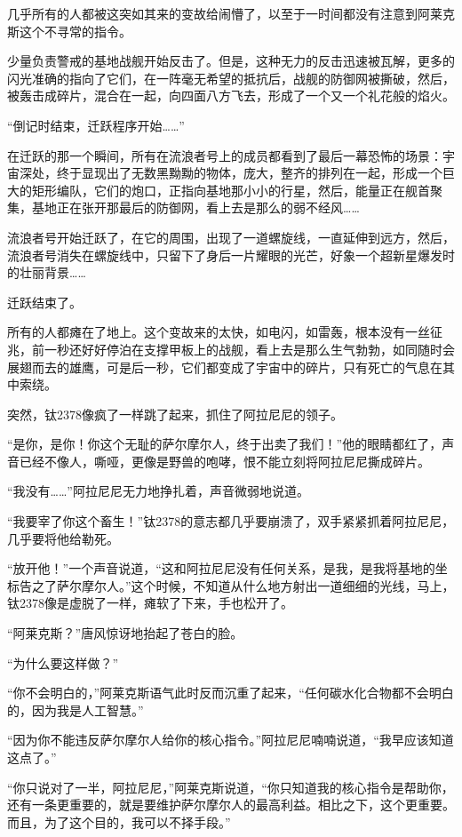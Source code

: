 几乎所有的人都被这突如其来的变故给闹懵了，以至于一时间都没有注意到阿莱克斯这个不寻常的指令。 

少量负责警戒的基地战舰开始反击了。但是，这种无力的反击迅速被瓦解，更多的闪光准确的指向了它们，在一阵毫无希望的抵抗后，战舰的防御网被撕破，然后，被轰击成碎片，混合在一起，向四面八方飞去，形成了一个又一个礼花般的焰火。 

“倒记时结束，迁跃程序开始……” 

在迁跃的那一个瞬间，所有在流浪者号上的成员都看到了最后一幕恐怖的场景：宇宙深处，终于显现出了无数黑黝黝的物体，庞大，整齐的排列在一起，形成一个巨大的矩形编队，它们的炮口，正指向基地那小小的行星，然后，能量正在舰首聚集，基地正在张开那最后的防御网，看上去是那么的弱不经风…… 

流浪者号开始迁跃了，在它的周围，出现了一道螺旋线，一直延伸到远方，然后，流浪者号消失在螺旋线中，只留下了身后一片耀眼的光芒，好象一个超新星爆发时的壮丽背景…… 

迁跃结束了。 

所有的人都瘫在了地上。这个变故来的太快，如电闪，如雷轰，根本没有一丝征兆，前一秒还好好停泊在支撑甲板上的战舰，看上去是那么生气勃勃，如同随时会展翅而去的雄鹰，可是后一秒，它们都变成了宇宙中的碎片，只有死亡的气息在其中索绕。 

突然，钛2378像疯了一样跳了起来，抓住了阿拉尼尼的领子。 

“是你，是你！你这个无耻的萨尔摩尔人，终于出卖了我们！”他的眼睛都红了，声音已经不像人，嘶哑，更像是野兽的咆哮，恨不能立刻将阿拉尼尼撕成碎片。 

“我没有……”阿拉尼尼无力地挣扎着，声音微弱地说道。 

“我要宰了你这个畜生！”钛2378的意志都几乎要崩溃了，双手紧紧抓着阿拉尼尼，几乎要将他给勒死。 

“放开他！”一个声音说道，“这和阿拉尼尼没有任何关系，是我，是我将基地的坐标告之了萨尔摩尔人。”这个时候，不知道从什么地方射出一道细细的光线，马上，钛2378像是虚脱了一样，瘫软了下来，手也松开了。 

“阿莱克斯？”唐风惊讶地抬起了苍白的脸。 

“为什么要这样做？” 

“你不会明白的，”阿莱克斯语气此时反而沉重了起来，“任何碳水化合物都不会明白的，因为我是人工智慧。” 

“因为你不能违反萨尔摩尔人给你的核心指令。”阿拉尼尼喃喃说道，“我早应该知道这点了。” 

“你只说对了一半，阿拉尼尼，”阿莱克斯说道，“你只知道我的核心指令是帮助你，还有一条更重要的，就是要维护萨尔摩尔人的最高利益。相比之下，这个更重要。而且，为了这个目的，我可以不择手段。” 

